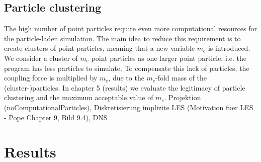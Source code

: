 \documentclass[a4paper,10pt]{article}
\numberwithin{equation}{section} %
\begin{document}
\subsection{Particle clustering}
The high number of point particles require even more computational resources for the particle-laden simulation. The main idea to reduce this requirement is to create clusters of point particles, meaning that a new variable $m_\mathrm{c}$ is introduced. We consider a cluster of $m_\mathrm{c}$ point particles as one larger point particle, i.e. the program has less particles to simulate. To compensate this lack of particles, the coupling force is multiplied by $m_\mathrm{c}$, due to the $m_\mathrm{c}$-fold mass of the (cluster-)particles. In chapter 5 (results) we evaluate the legitimacy of particle clustering and the maximum acceptable value of $m_\mathrm{c}$.
\newline
\newline
Projektion (noComputationalParticles), Diskretisierung
implizite LES (Motivation fuer LES -  Pope Chapter 9, Bild 9.4), DNS
\pagebreak
\section{Results}
\end{document}
